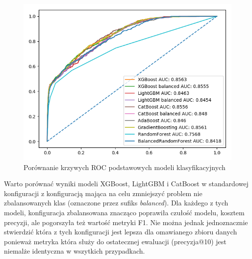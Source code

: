 \documentclass[a4paper,12pt]{article}
\begin{document}
    \begin{figure}
        \centering
        \includegraphics[width=\linewidth]{../images/roc-comparison.png}
        \caption{Porównanie krzywych ROC podstawowych modeli klasyfikacyjnych}
        \label{fig:roc-comparison}
    \end{figure}

    Warto porównać wyniki modeli XGBoost, LightGBM i CatBoost w standardowej konfiguracji z konfiguracją mająca na celu zmniejszyć problem nie zbalansowanych klas (oznaczone przez sufiks \textit{balanced}).
    Dla każdego z tych modeli, konfiguracja zbalansowana znacząco poprawiła czułość modelu, kosztem precyzji, ale pogorszyła też wartość metryki F1.
    Nie można jednak jednoznacznie stwierdzić która z tych konfiguracji jest lepsza dla omawianego zbioru danych ponieważ metryka która służy do ostatecznej ewaluacji (precyzja@10) jest niemalże identyczna w wszytkich przypadkach.
\end{document}
